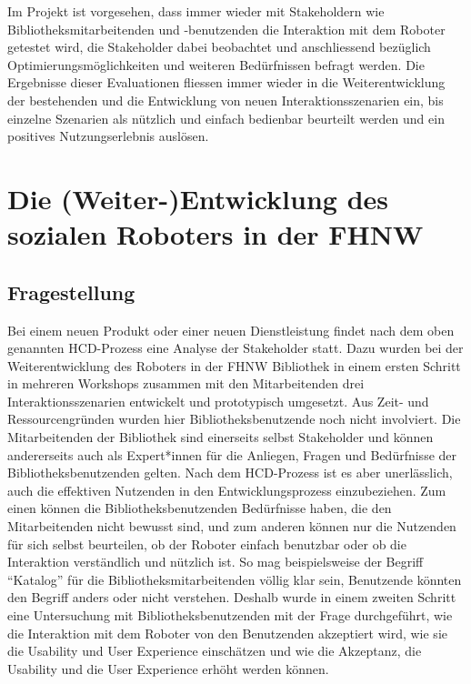 \documentclass[a4paper,
fontsize=11pt,
oneside,
numbers=noperiodatend,
parskip=half-,
bibliography=totoc,
final
]{scrartcl}
\begin{document}
Im Projekt ist vorgesehen, dass immer wieder mit Stakeholdern wie
Bibliotheksmitarbeitenden und -benutzenden die Interaktion mit dem
Roboter getestet wird, die Stakeholder dabei beobachtet und
anschliessend bezüglich Optimierungsmöglichkeiten und weiteren
Bedürfnissen befragt werden. Die Ergebnisse dieser Evaluationen fliessen
immer wieder in die Weiterentwicklung der bestehenden und die
Entwicklung von neuen Interaktionsszenarien ein, bis einzelne Szenarien
als nützlich und einfach bedienbar beurteilt werden und ein positives
Nutzungserlebnis auslösen.

\hypertarget{die-weiter-entwicklung-des-sozialen-roboters-in-der-fhnw}{%
\section{Die (Weiter-)Entwicklung des sozialen Roboters in der
FHNW}\label{die-weiter-entwicklung-des-sozialen-roboters-in-der-fhnw}}

\hypertarget{fragestellung}{%
\subsection{Fragestellung}\label{fragestellung}}

Bei einem neuen Produkt oder einer neuen Dienstleistung findet nach dem
oben genannten HCD-Prozess eine Analyse der Stakeholder statt. Dazu
wurden bei der Weiterentwicklung des Roboters in der FHNW Bibliothek in
einem ersten Schritt in mehreren Workshops zusammen mit den
Mitarbeitenden drei Interaktionsszenarien entwickelt und prototypisch
umgesetzt. Aus Zeit- und Ressourcengründen wurden hier
Bibliotheksbenutzende noch nicht involviert. Die Mitarbeitenden der
Bibliothek sind einerseits selbst Stakeholder und können andererseits
auch als Expert*innen für die Anliegen, Fragen und Bedürfnisse der
Bibliotheksbenutzenden gelten. Nach dem HCD-Prozess ist es aber
unerlässlich, auch die effektiven Nutzenden in den Entwicklungsprozess
einzubeziehen. Zum einen können die Bibliotheksbenutzenden Bedürfnisse
haben, die den Mitarbeitenden nicht bewusst sind, und zum anderen können
nur die Nutzenden für sich selbst beurteilen, ob der Roboter einfach
benutzbar oder ob die Interaktion verständlich und nützlich ist. So
mag beispielsweise der Begriff \enquote{Katalog} für die
Bibliotheksmitarbeitenden völlig klar sein, Benutzende könnten den
Begriff anders oder nicht verstehen. Deshalb wurde in einem zweiten
Schritt eine Untersuchung mit Bibliotheksbenutzenden mit der Frage
durchgeführt, wie die Interaktion mit dem Roboter von den Benutzenden
akzeptiert wird, wie sie die Usability und User Experience einschätzen
und wie die Akzeptanz, die Usability und die User Experience erhöht
werden können.
\end{document}
